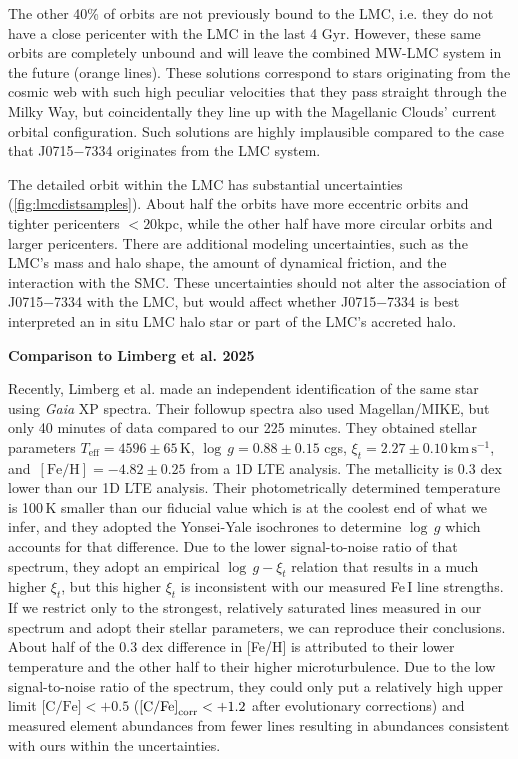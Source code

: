 \documentclass{natureprintstyle}
\newcommand{\unit}[1]{\ensuremath{\mathrm{\,#1}}\xspace}
\newcommand{\feh}{\unit{[Fe/H]}}
\newcommand{\teff}{\ensuremath{T_\mathrm{eff}}\xspace}
\newcommand{\Teff}{\teff}
\newcommand{\logg}{\ensuremath{\log\,g}\xspace}
\newcommand{\kms}{\unit{km\,s^{-1}}}
\newcommand{\umpstar}{J0715$-$7334\xspace}
\begin{document}
The other 40\% of orbits are not previously bound to the LMC, i.e. they do not have a close pericenter with the LMC in the last 4 Gyr. 
However, these same orbits are completely unbound and will leave the combined MW-LMC system in the future (orange lines). These solutions correspond to stars originating from the cosmic web with such high peculiar velocities that they pass straight through the Milky Way, but coincidentally they line up with the Magellanic Clouds' current orbital configuration. Such solutions are highly implausible compared to the case that \umpstar originates from the LMC system.

The detailed orbit within the LMC has substantial uncertainties (\ref{fig:lmcdistsamples}). About half the orbits have more eccentric orbits and tighter pericenters $<20$kpc, while the other half have more circular orbits and larger pericenters. There are additional modeling uncertainties, such as the LMC's mass and halo shape, the amount of dynamical friction, and the interaction with the SMC.
These uncertainties should not alter the association of \umpstar with the LMC, but would affect whether \umpstar is best interpreted an in situ LMC halo star or part of the LMC's accreted halo.

\vspace{1mm}
\noindent
{\bf Comparison to Limberg et al. 2025}

Recently, Limberg et al.\cite{Limberg2025} made an independent identification of the same star using \textit{Gaia} XP spectra\cite{Yao2024}.
Their followup spectra also used Magellan/MIKE, but only 40 minutes of data compared to our 225 minutes. They obtained stellar parameters $\Teff=4596 \pm 65$\,K, $\logg=0.88 \pm 0.15$ cgs, $\xi_t=2.27\pm0.10\kms$, and $\feh = -4.82 \pm 0.25$ from a 1D LTE analysis.
The metallicity is 0.3 dex lower than our 1D LTE analysis.
Their photometrically determined temperature is 100\,K smaller than our fiducial value which is at the coolest end of what we infer, and they adopted the Yonsei-Yale isochrones\cite{Yi2001,Demarque2004} to determine $\logg$ which accounts for that difference.
Due to the lower signal-to-noise ratio of that spectrum, they adopt an empirical $\logg-\xi_t$ relation\cite{Ji2023} that results in a much higher $\xi_t$, but this higher $\xi_t$ is inconsistent with our measured Fe\,I line strengths.
If we restrict only to the strongest, relatively saturated lines measured in our spectrum and adopt their stellar parameters, we can reproduce their conclusions. About half of the 0.3 dex difference in [Fe/H] is attributed to their lower temperature and the other half to their higher microturbulence. 
Due to the low signal-to-noise ratio of the spectrum, they could only put a relatively high upper limit $\mbox{[C/Fe]}  < +0.5$ ($\mbox{[C/Fe]}_{\rm corr} < +1.2$ after evolutionary corrections) and measured element abundances from fewer lines resulting in abundances consistent with ours within the uncertainties. 
\end{document}
